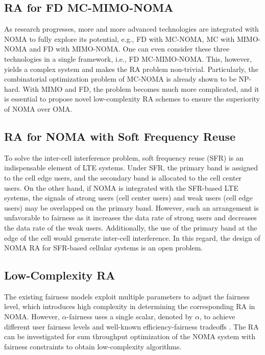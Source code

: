 \documentclass[10pt,final,journal,a4paper,twoside,twocolumn,romanappendices]{IEEEtran}
\theoremstyle{myremark}
\theoremstyle{myremark}
\begin{document}
\vspace{-0.2cm}
\subsection{RA for FD MC-MIMO-NOMA}
As research progresses, more and more advanced technologies are integrated with NOMA to
fully explore its potential, e.g., FD with MC-NOMA, MC with MIMO-NOMA and FD with
MIMO-NOMA. One can even consider these three technologies in a single framework, i.e.,
FD MC-MIMO-NOMA. This, however, yields a complex system and makes the RA problem non-trivial. Particularly, the combinatorial optimization problem of MC-NOMA is already shown
to be NP-hard. With MIMO and FD, the problem becomes much more complicated, and it is
essential to propose novel low-complexity RA schemes to ensure the superiority of NOMA over
OMA. 

\vspace{-0.2cm}
\subsection{RA for NOMA with Soft Frequency Reuse}
To solve the inter-cell interference problem, soft frequency reuse (SFR) is an indispensable element of LTE systems. Under SFR, the primary band is assigned to the cell edge users, and the secondary band is allocated to the cell center users. On the other hand, if NOMA is integrated with the SFR-based LTE systems, the signals of strong users (cell center users) and weak users (cell edge users) may be overlapped on the primary band. However, such an arrangement is unfavorable to fairness as it increases the data rate of strong users and decreases the data rate of the weak users. Additionally, the use of the primary band at the edge of the cell would generate inter-cell interference. In this regard, the design of NOMA RA for SFR-based cellular systems is an open problem.

\vspace{-0.2cm}
\subsection{Low-Complexity RA}
The existing fairness models exploit multiple parameters to adjust the fairness level, which introduces high complexity in determining the corresponding RA in NOMA. However, $\alpha$-fairness uses a single scalar, denoted by $\alpha$, to achieve different user fairness levels and well-known efficiency-fairness tradeoffs \cite{27}. The RA can be investigated for sum throughput optimization of the NOMA system with fairness constraints to obtain low-complexity algorithms.
\end{document}
